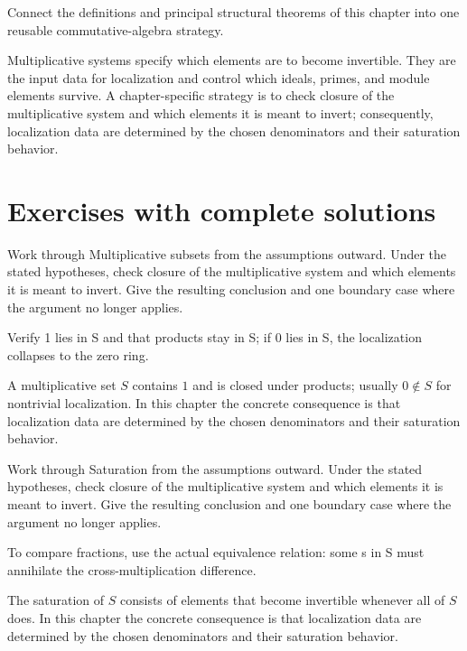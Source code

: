 \begin{problem}\label{prob:v05-problem-12}
Connect the definitions and principal structural theorems of this chapter into one reusable commutative-algebra strategy.
\end{problem}
\begin{solution}
Multiplicative systems specify which elements are to become invertible. They are the input data for localization and control which ideals, primes, and module elements survive. A chapter-specific strategy is to check closure of the multiplicative system and which elements it is meant to invert; consequently, localization data are determined by the chosen denominators and their saturation behavior.
\end{solution}

\section{Exercises with complete solutions}

\begin{exercise}\label{exr:v05-01}
Work through Multiplicative subsets from the assumptions outward. Under the stated hypotheses, check closure of the multiplicative system and which elements it is meant to invert. Give the resulting conclusion and one boundary case where the argument no longer applies.
\end{exercise}
\begin{hint}
Verify 1 lies in S and that products stay in S; if 0 lies in S, the localization collapses to the zero ring.
\end{hint}
\begin{solution}
A multiplicative set $S$ contains $1$ and is closed under products; usually $0\notin S$ for nontrivial localization. In this chapter the concrete consequence is that localization data are determined by the chosen denominators and their saturation behavior.
\end{solution}

\begin{exercise}\label{exr:v05-02}
Work through Saturation from the assumptions outward. Under the stated hypotheses, check closure of the multiplicative system and which elements it is meant to invert. Give the resulting conclusion and one boundary case where the argument no longer applies.
\end{exercise}
\begin{hint}
To compare fractions, use the actual equivalence relation: some s in S must annihilate the cross-multiplication difference.
\end{hint}
\begin{solution}
The saturation of $S$ consists of elements that become invertible whenever all of $S$ does. In this chapter the concrete consequence is that localization data are determined by the chosen denominators and their saturation behavior.
\end{solution}

